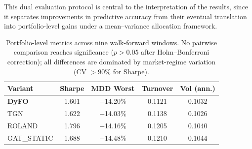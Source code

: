 \documentclass[runningheads]{llncs}
\begin{document}
This dual evaluation protocol is central to the interpretation of the results, since it separates improvements in predictive accuracy from their eventual translation into portfolio-level gains under a mean--variance allocation framework.


\begin{table}[ht]
\caption{Portfolio-level metrics across nine walk-forward windows. No pairwise comparison reaches significance ($p > 0.05$ after Holm--Bonferroni correction); all differences are dominated by market-regime variation (CV $> 90\%$ for Sharpe).}
\label{tab:gmv_sharpe}
\centering
\begin{tabular}{|l|c|c|c|c|}
\hline
\textbf{Variant} & \textbf{Sharpe} & \textbf{MDD Worst} &
\textbf{Turnover} & \textbf{Vol (ann.)} \\
\hline
\textbf{DyFO} & 1.601 & $-$14.20\% & 0.1121 & 0.1032 \\
TGN         & 1.622 & $-$14.03\% & 0.1138 & 0.1026 \\
ROLAND      & 1.796 & $-$14.16\% & 0.1205 & 0.1040 \\
GAT\_STATIC & 1.688 & $-$14.48\% & 0.1210 & 0.1044 \\
\hline
\end{tabular}
\end{table}
\end{document}
